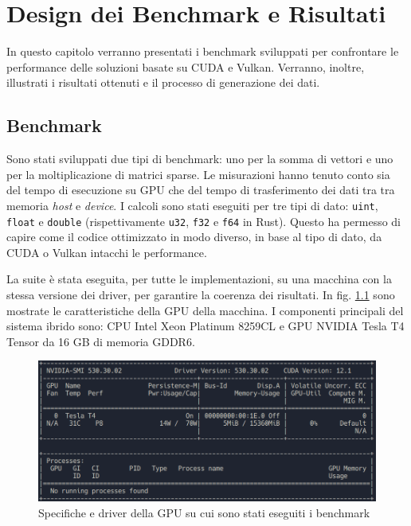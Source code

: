 \chapter{Design dei Benchmark e Risultati}
\label{sec:benchmark}

In questo capitolo verranno presentati i benchmark sviluppati per confrontare le performance delle soluzioni basate su \gls{CUDA} e Vulkan. Verranno, inoltre, illustrati i risultati ottenuti e il processo di generazione dei dati.

\section{Benchmark}

Sono stati sviluppati due tipi di benchmark: uno per la somma di vettori e uno per la moltiplicazione di matrici sparse. Le misurazioni hanno tenuto conto sia del tempo di esecuzione su \gls{GPU} che del tempo di trasferimento dei dati tra tra memoria \textit{host} e \textit{device}. I calcoli sono stati eseguiti per tre tipi di dato: \verb|uint|, \verb|float| e \verb|double| (rispettivamente \verb|u32|, \verb|f32| e \verb|f64| in Rust). Questo ha permesso di capire come il codice ottimizzato in modo diverso, in base al tipo di dato, da \gls{CUDA} o Vulkan intacchi le performance.

La suite è stata eseguita, per tutte le implementazioni, su una macchina con la stessa versione dei driver, per garantire la coerenza dei risultati. In fig. \ref{fig:macchina} sono mostrate le caratteristiche della \gls{GPU} della macchina. I componenti principali del sistema ibrido sono: \gls{CPU} Intel Xeon Platinum 8259CL e \gls{GPU} NVIDIA Tesla T4 Tensor da 16 GB di memoria GDDR6.

\begin{figure}[ht]
    \centering
    \includegraphics[width=.9\linewidth]{images/chapter4/macchina.png}
    \caption{Specifiche e driver della GPU su cui sono stati eseguiti i benchmark}
    \label{fig:macchina}
\end{figure}

